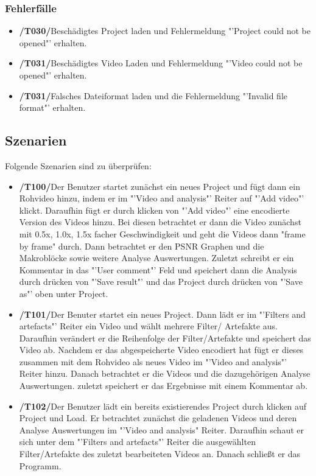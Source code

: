\documentclass[parskip=full]{scrartcl}
\begin{document}
\subsubsection{Fehlerfälle}
\begin{itemize}
\item[]\textbf{/T030/}\qquad Beschädigtes Project laden und Fehlermeldung "'Project could not be opened"' erhalten.
\item[]\textbf{/T031/}\qquad Beschädigtes Video Laden und Fehlermeldung "'Video could not be opened"' erhalten.
\item[]\textbf{/T031/}\qquad Falsches Dateiformat laden und die Fehlermeldung "'Invalid file format"' erhalten.
\end{itemize}
\subsection{Szenarien}
Folgende Szenarien sind zu überprüfen:
\begin{itemize}
\item[]\textbf{/T100/}\qquad Der Benutzer startet zunächst ein neues Project und fügt dann ein Rohvideo hinzu, indem er im "'Video and analysis"' Reiter auf "'Add video"' klickt. Daraufhin fügt er durch klicken von "'Add video"' eine encodierte Version des Videos hinzu. Bei diesen betrachtet er dann die Video zunächst mit 0.5x, 1.0x, 1.5x facher Geschwindigkeit und geht die Videos dann "frame by frame" durch. Dann betrachtet er den PSNR Graphen und die Makroblöcke sowie weitere Analyse Auswertungen. Zuletzt schreibt er ein Kommentar in das "'User comment"' Feld und speichert dann die Analysis durch drücken von "'Save result"' und das Project durch drücken von "'Save as"' oben unter Project.
\item[]\textbf{/T101/}\qquad Der Benuter startet ein neues Project. Dann lädt er im "'Filters and artefacts"' Reiter ein Video und wählt mehrere Filter/ Artefakte aus. Daraufhin verändert er die Reihenfolge der Filter/Artefakte und speichert das Video ab. Nachdem er das abgespeicherte Video encodiert hat fügt er dieses zusammen mit dem Rohvideo als neues Video im "'Video and analysis"' Reiter hinzu. Danach betrachtet er die Videos und die dazugehörigen Analyse Auswertungen. zuletzt speichert er das Ergebnisse mit einem Kommentar ab.
\item[]\textbf{/T102/}\qquad Der Benutzer lädt ein bereits existierendes Project durch klicken auf Project und Load. Er betrachtet zunächst die geladenen Videos und deren Analyse Auswertungen im "'Video and analysis" Reiter. Daraufhin schaut er sich unter dem "'Filters and artefacts"' Reiter die ausgewählten Filter/Artefakte des zuletzt bearbeiteten Videos an. Danach schließt er das Programm.
\end{itemize}
\newpage
\end{document}
